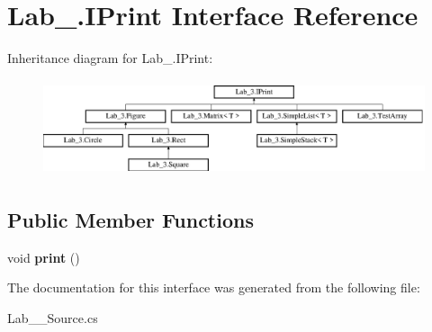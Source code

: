 \hypertarget{interface_lab__3_1_1_i_print}{}\section{Lab\+\_.\+I\+Print Interface Reference}
\label{interface_lab__3_1_1_i_print}
Inheritance diagram for Lab\+\_.\+I\+Print\+:\begin{figure}[H]
\begin{center}
\leavevmode
\includegraphics[height=2.835443cm]{interface_lab__3_1_1_i_print}
\end{center}
\end{figure}
\subsection*{Public Member Functions}
\begin{DoxyCompactItemize}
\item 
\mbox{\label{interface_lab__3_1_1_i_print_a0584c14a36a3e38410d6c789cf0941e4}} 
void {\bfseries print} ()
\end{DoxyCompactItemize}


The documentation for this interface was generated from the following file\+:\begin{DoxyCompactItemize}
\item 
Lab\+\_\+\_\+\+Source.\+cs\end{DoxyCompactItemize}
